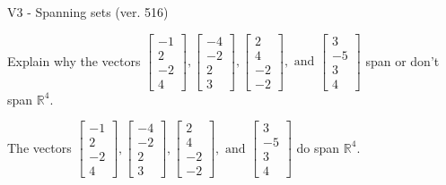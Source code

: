 \begin{exercise}
  \begin{exerciseTitle}V3 - Spanning sets (ver. 516)\end{exerciseTitle}
  \begin{exerciseStatement}
    Explain why the vectors \(\left[\begin{array}{r}
-1 \\
2 \\
-2 \\
4
\end{array}\right] , \left[\begin{array}{r}
-4 \\
-2 \\
2 \\
3
\end{array}\right] , \left[\begin{array}{r}
2 \\
4 \\
-2 \\
-2
\end{array}\right] , \text{ and } \left[\begin{array}{r}
3 \\
-5 \\
3 \\
4
\end{array}\right]\) span or don't span \(\mathbb{R}^4\). 
	


  \end{exerciseStatement}
  \begin{exerciseAnswer}
   The vectors \(\left[\begin{array}{r}
-1 \\
2 \\
-2 \\
4
\end{array}\right] , \left[\begin{array}{r}
-4 \\
-2 \\
2 \\
3
\end{array}\right] , \left[\begin{array}{r}
2 \\
4 \\
-2 \\
-2
\end{array}\right] , \text{ and } \left[\begin{array}{r}
3 \\
-5 \\
3 \\
4
\end{array}\right]\) 
  	 do  
	span \(\mathbb{R}^4\).
  


  \end{exerciseAnswer}
\end{exercise}